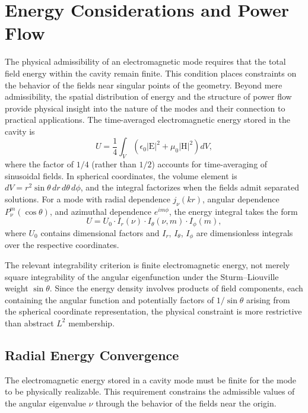 \documentclass[
  aip,
  amsmath,amssymb,
  preprint
]{revtex4-1}
\begin{document}
\section{Energy Considerations and Power Flow}

\label{energy}
The physical admissibility of an electromagnetic mode requires that the total field energy within the cavity remain finite. This condition places constraints on the behavior of the fields near singular points of the geometry. Beyond mere admissibility, the spatial distribution of energy and the structure of power flow provide physical insight into the nature of the modes and their connection to practical applications. The time-averaged electromagnetic energy stored in the cavity is
\begin{equation}
U = \frac{1}{4} \int_V \left( \epsilon_0 |\mathrm{E}|^2 + \mu_0 |\mathrm{H}|^2 \right) dV,
\label{eq:total_energy}
\end{equation}
where the factor of $1/4$ (rather than $1/2$) accounts for time-averaging of sinusoidal fields. In spherical coordinates, the volume element is $dV = r^2 \sin\theta \, dr \, d\theta \, d\phi$, and the integral factorizes when the fields admit separated solutions. For a mode with radial dependence $j_\nu(kr)$, angular dependence $P_\nu^m(\cos\theta)$, and azimuthal dependence $e^{im\phi}$, the energy integral takes the form
\begin{equation}
U = U_0 \cdot I_r(\nu) \cdot I_\theta(\nu, m) \cdot I_\phi(m),
\label{eq:energy_factored}
\end{equation}
where $U_0$ contains dimensional factors and $I_r$, $I_\theta$, $I_\phi$ are dimensionless integrals over the respective coordinates.

The relevant integrability criterion is finite electromagnetic energy, not merely square integrability of the angular eigenfunction under the Sturm--Liouville weight $\sin\theta$. Since the energy density involves products of field components, each containing the angular function and potentially factors of $1/\sin\theta$ arising from the spherical coordinate representation, the physical constraint is more restrictive than abstract $L^{2}$ membership.


\subsection{Radial Energy Convergence}
\label{subsec:radial_energy}

The electromagnetic energy stored in a cavity mode must be finite for the mode to be physically realizable. This requirement constrains the admissible values of the angular eigenvalue $\nu$ through the behavior of the fields near the origin.
\end{document}
